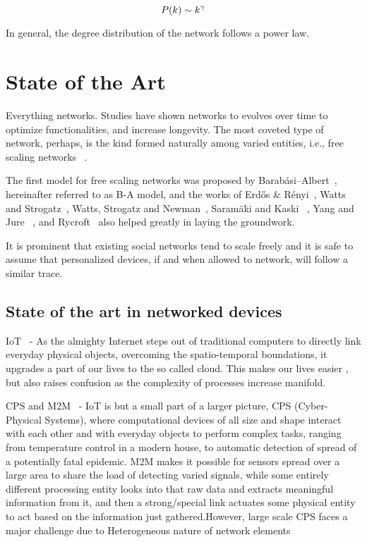 \begin{equation}
P(k) \sim k^{\-\gamma}
\label{eqn:power law}
\end{equation}

In general, the degree distribution of the network follows a power law. 



\section{State of the Art}
Everything networks. Studies have shown networks to evolves over time to optimize functionalities, and increase longevity. The most coveted type of network, perhaps, is the kind formed naturally among varied entities, i.e., free scaling networks ~\cite{1999Sci...286..509B, 2002RvMP...74...47A}.

The first model for free scaling networks was proposed by Barab{\'a}si–Albert~\cite{1999Sci...286..509B}, hereinafter referred to as B-A model, and the works of Erd\H{o}s \& R\'{e}nyi~\cite{Erdos60onthe}, Watts and Strogatz~\cite{1251797}, Watts, Strogatz and Newman~\cite{PhysRevE.64.026118},  Saramäki  and Kaski~\cite{Saramaki200480} , Yang and Jure~\cite{Yang_modelinginformation} , and  Rycroft~\cite{Rycroft2007565} also helped greatly in laying the groundwork.

It is prominent that existing social networks tend to scale freely and it is safe to assume that personalized devices, if and when allowed to network, will follow a similar trace.

\subsection{State of the art in networked devices}

IoT~\cite{Internet-of-things} - As the almighty Internet steps out of traditional computers to directly link everyday physical objects, overcoming the spatio-temporal boundations, it upgrades a part of our lives to the so called cloud.
This makes our lives easier , but also raises confusion as the complexity of processes increase manifold. 

CPS and M2M~\cite{6601317} - IoT is but a small part of a larger picture, CPS (Cyber-Physical Systems), where computational devices of all size and shape interact with each other and with everyday objects to perform complex tasks, ranging from temperature control in a modern house, to automatic detection of spread of a potentially fatal epidemic.
M2M makes it possible for sensors spread over a large area to share the load of detecting varied signals, while some entirely different processing entity looks into that raw data and extracts meaningful information from it, and then a strong/special link actuates some physical entity to act based on the  information just gathered.However, large scale CPS faces a major challenge due to Heterogeneous nature of network elements

